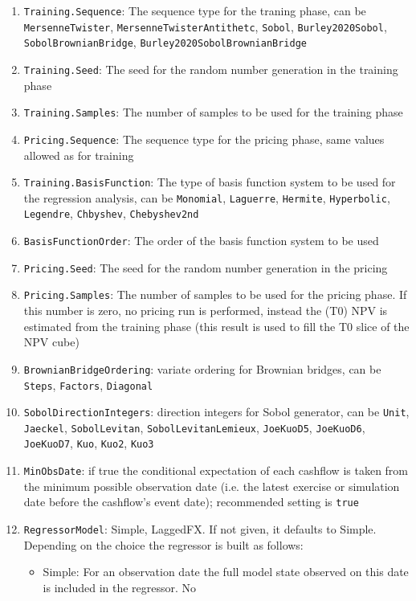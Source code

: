 \documentclass[12pt, a4paper]{article}
\begin{document}
\begin{enumerate}
\item \verb+Training.Sequence+: The sequence type for the traning phase, can be \verb+MersenneTwister+,
  \verb+MersenneTwisterAntithetc+, \verb+Sobol+, \verb+Burley2020Sobol+, \verb+SobolBrownianBridge+,
  \verb+Burley2020SobolBrownianBridge+
\item \verb+Training.Seed+: The seed for the random number generation in the training phase
\item \verb+Training.Samples+: The number of samples to be used for the training phase
\item \verb+Pricing.Sequence+: The sequence type for the pricing phase, same values allowed as for training
\item \verb+Training.BasisFunction+: The type of basis function system to be used for the regression analysis, can be
  \verb+Monomial+, \verb+Laguerre+, \verb+Hermite+, \verb+Hyperbolic+, \verb+Legendre+, \verb+Chbyshev+,
  \verb+Chebyshev2nd+
\item \verb+BasisFunctionOrder+: The order of the basis function system to be used
\item \verb+Pricing.Seed+: The seed for the random number generation in the pricing
\item \verb+Pricing.Samples+: The number of samples to be used for the pricing phase. If this number is zero, no pricing
  run is performed, instead the (T0) NPV is estimated from the training phase (this result is used to fill the T0 slice
  of the NPV cube)
\item \verb+BrownianBridgeOrdering+: variate ordering for Brownian bridges, can be \verb+Steps+, \verb+Factors+,
  \verb+Diagonal+
\item \verb+SobolDirectionIntegers+: direction integers for Sobol generator, can be \verb+Unit+, \verb+Jaeckel+,
  \verb+SobolLevitan+, \verb+SobolLevitanLemieux+, \verb+JoeKuoD5+, \verb+JoeKuoD6+, \verb+JoeKuoD7+,
  \verb+Kuo+, \verb+Kuo2+, \verb+Kuo3+
\item \verb+MinObsDate+: if true the conditional expectation of each cashflow is taken from the minimum possible
  observation date (i.e. the latest exercise or simulation date before the cashflow's event date); recommended setting
  is \verb+true+
\item \verb+RegressorModel+: Simple, LaggedFX. If not given, it defaults to Simple. Depending on the choice the
  regressor is built as follows:
  \begin{itemize}
    \item Simple: For an observation date the full model state observed on this date is included in the regressor. No

\end{itemize}
\end{enumerate}
\end{document}
